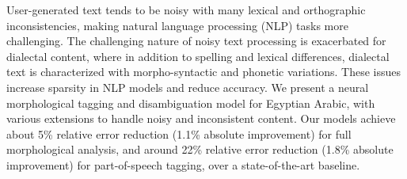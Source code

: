 User-generated text tends to be noisy with many lexical and orthographic inconsistencies, making natural language processing (NLP) tasks more challenging. The challenging nature of noisy text processing is exacerbated for dialectal content, where in addition to spelling and lexical differences, dialectal text is characterized with morpho-syntactic and phonetic variations. These issues increase sparsity in NLP models and reduce accuracy. We present a neural morphological tagging and disambiguation model for Egyptian Arabic, with various extensions to handle noisy and inconsistent content. Our models achieve about 5\% relative error reduction (1.1\% absolute improvement) for full morphological analysis, and around 22\% relative error reduction (1.8\% absolute improvement) for part-of-speech tagging, over a state-of-the-art baseline.
